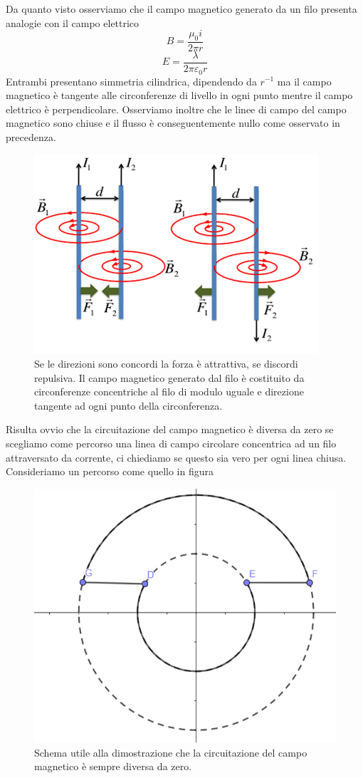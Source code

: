 \documentclass[
10pt, %
a4paper, %
oneside, %
headinclude,footinclude, %
BCOR5mm, %
]{scrartcl}
\begin{document}
Da quanto visto osserviamo che il campo magnetico generato da un filo presenta analogie con il campo elettrico
\[B = \frac{\mu_0 i}{2\pi r}\]
\[E = \frac{\lambda}{2\pi \varepsilon_0 r}\]
Entrambi presentano simmetria cilindrica, dipendendo da \(r^{-1}\) ma il campo magnetico è tangente alle circonferenze di livello in ogni punto mentre il campo elettrico è perpendicolare. Osserviamo inoltre che le linee di campo del campo magnetico sono chiuse e il flusso è conseguentemente nullo come osservato in precedenza. 
\begin{figure}[h!]
	\centering
	\includegraphics[width=0.6\linewidth]{../images/esperimento_ampere}
	\caption{Se le direzioni sono concordi la forza è attrattiva, se discordi repulsiva. Il campo magnetico generato dal filo è costituito da circonferenze concentriche al filo di modulo uguale e direzione tangente ad ogni punto della circonferenza.}
	\label{fig:esperimentoampere}
\end{figure}
\FloatBarrier
Risulta ovvio che la circuitazione del campo magnetico è diversa da zero se scegliamo come percorso una linea di campo circolare concentrica ad un filo attraversato da corrente, ci chiediamo se questo sia vero per ogni linea chiusa. Consideriamo un percorso come quello in figura 
\begin{figure}[h!]
	\centering
	\includegraphics[width=0.5\linewidth]{../images/circuitazione_campo_magnetico}
	\caption{Schema utile alla dimostrazione che la circuitazione del campo magnetico è sempre diversa da zero.}
	\label{fig:circuitazionecampomagnetico}
\end{figure}
\end{document}
